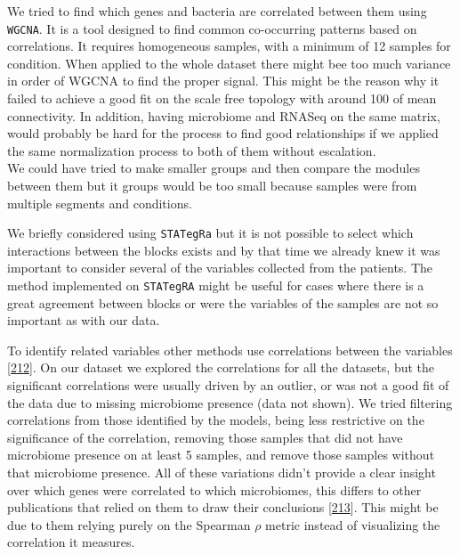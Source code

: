 \documentclass[
  a4paper,
]{book}
\begin{document}
We tried to find which genes and bacteria are correlated between them using \texttt{WGCNA}.
It is a tool designed to find common co-occurring patterns based on correlations.
It requires homogeneous samples, with a minimum of 12 samples for condition.
When applied to the whole dataset there might bee too much variance in order of WGCNA to find the proper signal.
This might be the reason why it failed to achieve a good fit on the scale free topology with around 100 of mean connectivity.
In addition, having microbiome and RNASeq on the same matrix, would probably be hard for the process to find good relationships if we applied the same normalization process to both of them without escalation.\\
We could have tried to make smaller groups and then compare the modules between them but it groups would be too small because samples were from multiple segments and conditions.

We briefly considered using \texttt{STATegRa} but it is not possible to select which interactions between the blocks exists and by that time we already knew it was important to consider several of the variables collected from the patients.
The method implemented on \texttt{STATegRA} might be useful for cases where there is a great agreement between blocks or were the variables of the samples are not so important as with our data.

To identify related variables other methods use correlations between the variables {[}\protect\hyperlink{ref-vila-casadesuxfas2016}{212}{]}.
On our dataset we explored the correlations for all the datasets, but the significant correlations were usually driven by an outlier, or was not a good fit of the data due to missing microbiome presence (data not shown).
We tried filtering correlations from those identified by the models, being less restrictive on the significance of the correlation, removing those samples that did not have microbiome presence on at least 5 samples, and remove those samples without that microbiome presence.
All of these variations didn't provide a clear insight over which genes were correlated to which microbiomes, this differs to other publications that relied on them to draw their conclusions {[}\protect\hyperlink{ref-huxe4sler2017}{213}{]}.
This might be due to them relying purely on the Spearman \(\rho\) metric instead of visualizing the correlation it measures.
\end{document}
